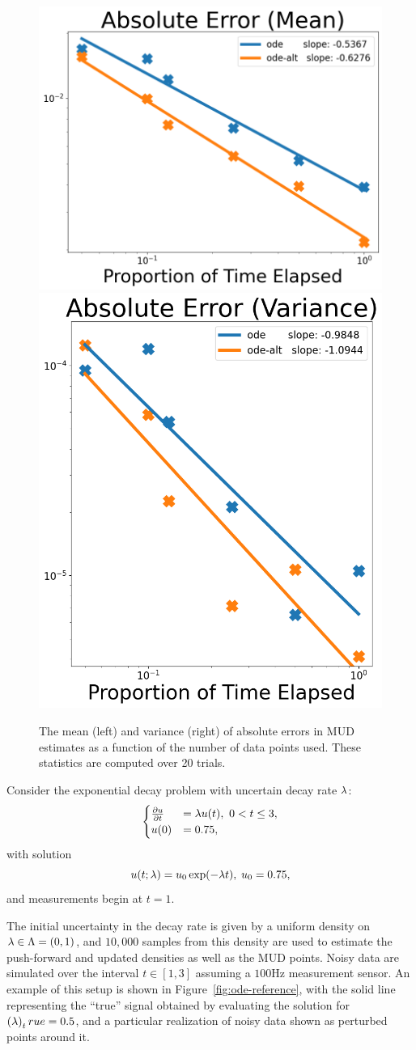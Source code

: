 \begin{figure}[htb]
  \centering
  \includegraphics[width=0.4\linewidth]{figures/ode/ode_convergence_mud_obs_mean}
  \includegraphics[width=0.4\linewidth]{figures/ode/ode_convergence_mud_obs_var}
  \caption{The mean (left) and variance (right) of absolute errors in MUD estimates as a function of the number of data points used. These statistics are computed over 20 trials.
  {
  }
  }
  \label{fig:ode-convergence-obs}
\end{figure}

Consider the exponential decay problem with uncertain decay rate $\lambda$:
$$
\begin{cases}
\frac{\partial u}{\partial t} & = \lambda u(t), \ 0<t\leq 3, \\ u(0) &= 0.75,
\end{cases}
$$
with solution
\begin{equation}
  u(t;\lambda) = u_0\exp(-\lambda t), \; u_0 = 0.75 ,
\end{equation}
and measurements begin at $t=1$.

The initial uncertainty in the decay rate is given by a uniform density on $\lambda \in \Lambda = (0, 1)$, and $10,000$ samples from this density are used to estimate the push-forward and updated densities as well as the MUD points.
Noisy data are simulated over the interval $t \in [1,3]$ assuming a $100$Hz measurement sensor.
An example of this setup is shown in Figure~\ref{fig:ode-reference}, with the solid line representing the ``true'' signal obtained by evaluating the solution for $\left ( \lambda \right )_true = 0.5$, and a particular realization of noisy data shown as perturbed points around it.

